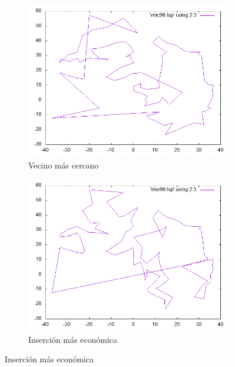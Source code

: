 \documentclass[12pt,spanish]{article}
\begin{document}
\begin{figure}[H]
\centering
\begin{subfigure}[b]{0.36\textwidth}
\includegraphics[width=\textwidth]{gr96_vmc.png}
\caption{Vecino más cercano}
\end{subfigure}
\quad
\begin{subfigure}[b]{0.36\textwidth}
\includegraphics[width=\textwidth]{gr96_ime.png}
\caption{Inserción más económica}
\end{subfigure}

\vspace{1cm}


\end{figure}
\end{document}
